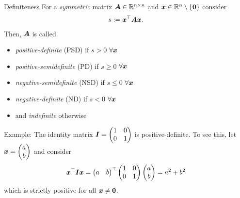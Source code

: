 \begin{frame}{Definiteness}
    For a \emph{symmetric} matrix $\bm{A} \in \mathbb{R}^{n \times n}$ and
    $\bm{x} \in \mathbb{R}^n \setminus \{\bm{0}\}$ consider $$s := \bm{x}^\top \bm{A} \bm{x}.$$

    Then, $\bm{A}$ is called
    \begin{itemize}
        \item \emph{positive-definite} (PSD) if $s > 0$ $\forall \bm{x}$
        \item \emph{positive-semidefinite} (PD) if $s \geq 0$ $\forall \bm{x}$
        \item \emph{negative-semidefinite} (NSD) if $s \leq 0$ $\forall \bm{x}$
        \item \emph{negative-definite} (ND) if $s < 0$ $\forall \bm{x}$
        \item and \emph{indefinite} otherwise
    \end{itemize}

    Example:
    The identity matrix $\bm{I} = \begin{pmatrix} 1 & 0 \\ 0 & 1 \end{pmatrix}$ is positive-definite. To see this, let $\v x = \mqty(a \\ b)$ and consider
    $$\bm{x}^\top \bm{I} \bm{x} = \begin{pmatrix} a & b \end{pmatrix}^\top \begin{pmatrix} 1 & 0 \\ 0 & 1 \end{pmatrix} \begin{pmatrix} a \\ b \end{pmatrix} = a^2 + b^2$$
    which is strictly positive for all $\bm{x} \neq \bm{0}$.
\end{frame}

